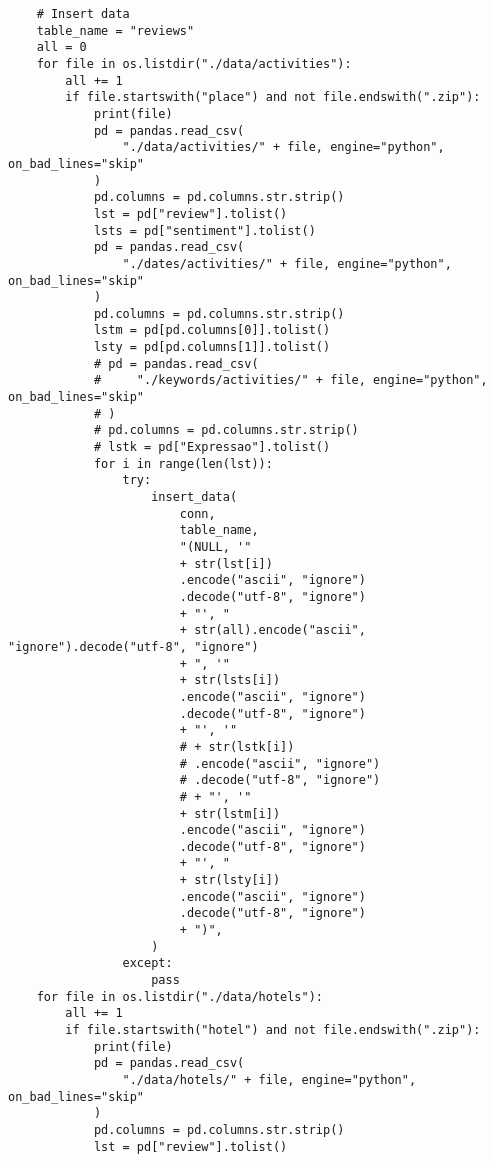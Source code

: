 \begin{verbatim}
    # Insert data
    table_name = "reviews"
    all = 0
    for file in os.listdir("./data/activities"):
        all += 1
        if file.startswith("place") and not file.endswith(".zip"):
            print(file)
            pd = pandas.read_csv(
                "./data/activities/" + file, engine="python", on_bad_lines="skip"
            )
            pd.columns = pd.columns.str.strip()
            lst = pd["review"].tolist()
            lsts = pd["sentiment"].tolist()
            pd = pandas.read_csv(
                "./dates/activities/" + file, engine="python", on_bad_lines="skip"
            )
            pd.columns = pd.columns.str.strip()
            lstm = pd[pd.columns[0]].tolist()
            lsty = pd[pd.columns[1]].tolist()
            # pd = pandas.read_csv(
            #     "./keywords/activities/" + file, engine="python", on_bad_lines="skip"
            # )
            # pd.columns = pd.columns.str.strip()
            # lstk = pd["Expressao"].tolist()
            for i in range(len(lst)):
                try:
                    insert_data(
                        conn,
                        table_name,
                        "(NULL, '"
                        + str(lst[i])
                        .encode("ascii", "ignore")
                        .decode("utf-8", "ignore")
                        + "', "
                        + str(all).encode("ascii", "ignore").decode("utf-8", "ignore")
                        + ", '"
                        + str(lsts[i])
                        .encode("ascii", "ignore")
                        .decode("utf-8", "ignore")
                        + "', '"
                        # + str(lstk[i])
                        # .encode("ascii", "ignore")
                        # .decode("utf-8", "ignore")
                        # + "', '"
                        + str(lstm[i])
                        .encode("ascii", "ignore")
                        .decode("utf-8", "ignore")
                        + "', "
                        + str(lsty[i])
                        .encode("ascii", "ignore")
                        .decode("utf-8", "ignore")
                        + ")",
                    )
                except:
                    pass
    for file in os.listdir("./data/hotels"):
        all += 1
        if file.startswith("hotel") and not file.endswith(".zip"):
            print(file)
            pd = pandas.read_csv(
                "./data/hotels/" + file, engine="python", on_bad_lines="skip"
            )
            pd.columns = pd.columns.str.strip()
            lst = pd["review"].tolist()

\end{verbatim}
